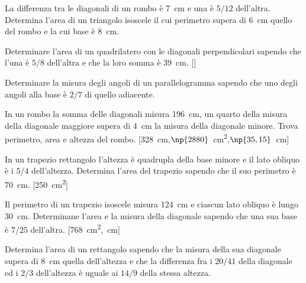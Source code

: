 \begin{multicols}{2}
\begin{esercizio}
\label{ese:7.58}
La differenza tra le diagonali di un rombo è 7~cm e una è \(5/12\) 
dell'altra. Determina l'area di un triangolo isoscele il cui 
perimetro supera di 6~cm quello del rombo e la cui base è 8~cm.
\end{esercizio}

\begin{esercizio}
\label{ese:7.59}
Determinare l'area di un quadrilatero con le diagonali perpendicolari 
sapendo che l'una è \(5/8\) dell'altra e che la loro somma è 39~cm.
\hfill[]
\end{esercizio}

\begin{esercizio}
\label{ese:7.60}
Determinare la misura degli angoli di un parallelogramma sapendo che 
uno degli angoli alla base è \(2/7\) di quello adiacente.
\end{esercizio}

\begin{esercizio}
\label{ese:7.64}
In un rombo la somma delle diagonali misura 196~cm, un quarto della 
misura della diagonale maggiore supera di 4~cm la misura della 
diagonale minore. Trova perimetro, area e altezza del rombo.
\hfill[328~cm,\quad \(\np{2880}\)~cm\textsuperscript{2},\quad \(\np{35,15}\)~cm]
\end{esercizio}

\begin{esercizio}
\label{ese:7.65}
In un trapezio rettangolo l'altezza è quadrupla della base minore e 
il lato obliquo è i \(5/4\) dell'altezza. Determina l'area del trapezio 
sapendo che il suo perimetro è 70~cm.
\hfill[250~cm\textsuperscript{2}]
\end{esercizio}

\begin{esercizio}
\label{ese:7.66}
Il perimetro di un trapezio isoscele misura 124~cm e ciascun lato 
obliquo è lungo 30~cm. Determinane l'area e la misura della diagonale 
sapendo che una sua base è \(7/25\) dell'altra.
\hfill[768~cm\textsuperscript{2},~cm]
\end{esercizio}

\begin{esercizio}
\label{ese:7.67}
Determina l'area di un rettangolo sapendo che la misura della sua 
diagonale supera di 8~cm quella dell'altezza e che la differenza fra 
i \(20/41\) della diagonale ed i \(2/3\) dell'altezza è uguale ai \(14/9\) 
della stessa altezza.
\end{esercizio}


\end{multicols}
